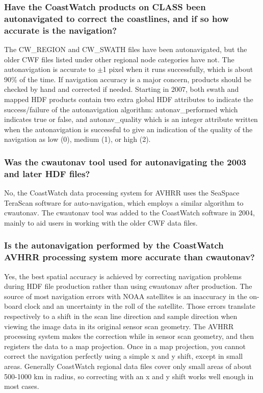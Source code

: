 \subsubsection*{Have the CoastWatch products on CLASS been autonavigated to correct the coastlines, and if so how accurate is the navigation?}

The CW\_REGION and CW\_SWATH files have been autonavigated, but the
older CWF files listed under other regional node categories have not.
The autonavigation is accurate to $\pm$1 pixel when it runs
successfully, which is about 90\% of the time.  If navigation accuracy
is a major concern, products should be checked by hand and corrected
if needed.  Starting in 2007, both swath and mapped HDF products
contain two extra global HDF attributes to indicate the
success/failure of the autonavigation algorithm: {\file
autonav\_performed} which indicates {\file true} or {\file false}, and
{\file autonav\_quality} which is an integer attribute written when
the autonavigation is successful to give an indication of the quality
of the navigation as low (0), medium (1), or high (2).

\subsubsection*{Was the cwautonav tool used for autonavigating the 2003 and later HDF files?}

No, the CoastWatch data processing system for AVHRR uses the SeaSpace
TeraScan software for auto-navigation, which employs a similar
algorithm to cwautonav.  The cwautonav tool was added to the
CoastWatch software in 2004, mainly to aid users in working with the
older CWF data files.

\subsubsection*{Is the autonavigation performed by the CoastWatch AVHRR processing system more accurate than cwautonav?}

Yes, the best spatial accuracy is achieved by correcting navigation
problems during HDF file production rather than using cwautonav after
production.  The source of most navigation errors with NOAA satellites
is an inaccuracy in the on-board clock and an uncertainty in the roll
of the satellite.  Those errors translate respectively to a shift in
the scan line direction and sample direction when viewing the image
data in its original sensor scan geometry.  The AVHRR processing
system makes the correction while in sensor scan geometry, and then
registers the data to a map projection.  Once in a map projection, you
cannot correct the navigation perfectly using a simple x and y shift,
except in small areas.  Generally CoastWatch regional data files cover
only small areas of about 500-1000 km in radius, so correcting with an
x and y shift works well enough in most cases.

